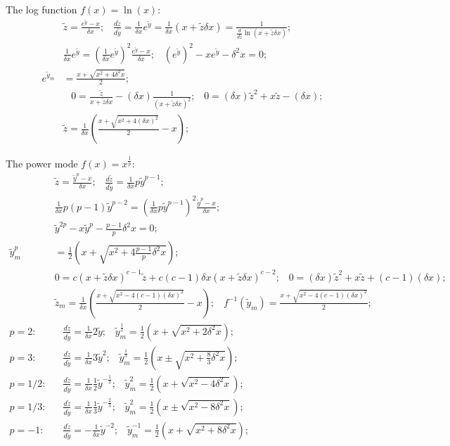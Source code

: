 \documentclass[twoside]{article}
\numberwithin{equation}{section}
\newcommand{\eqspace}{\;\;\;}
\begin{document}
The log function $f(x) = \ln(x)$:
\begin{align*}
& \tilde{z} = \frac{e^{\tilde{y}} - x}{\delta x}; \eqspace 
\frac{d \tilde{z}}{d \tilde{y}} = \frac{1}{\delta x} e^{\tilde{y}} = \frac{1}{\delta x} (x + \tilde{z} \delta x)
 = \frac{1}{\frac{d}{d \tilde{z}} \ln(x + \tilde{z} \delta x)}; \\
& \frac{1}{\delta x} e^{\tilde{y}} = (\frac{1}{\delta x} e^{\tilde{y}})^2 \frac{e^{\tilde{y}} - x}{\delta x}; \eqspace 
(e^{\tilde{y}})^2 - x e^{\tilde{y}} - \delta^2 x = 0; \\
e^{\tilde{y}_m} &= \frac{x + \sqrt{x^2 + 4 \delta^2 x}}{2}; \\
& \eqspace 0 = \frac{\tilde{z}}{x + \tilde{z} \delta x} - (\delta x) \frac{1}{(x + \tilde{z} \delta x)^2}; \eqspace
0 = (\delta x) \tilde{z}^2 + x \tilde{z} - (\delta x); \\
& \tilde{z} = \frac{1}{\delta x}(\frac{x + \sqrt{x^2 + 4 (\delta x)^2}}{2} - x);
\end{align*}

The power mode $f(x) = x^{\frac{1}{p}}$:
\begin{align*}
& \tilde{z} = \frac{\tilde{y}^p - x}{\delta x}; \eqspace 
\frac{d \tilde{z}}{d \tilde{y}} = \frac{1}{\delta x} p \tilde{y}^{p-1}; \\
& \frac{1}{\delta x} p (p - 1) \tilde{y}^{p-2} = (\frac{1}{\delta x} p \tilde{y}^{p-1})^2 \frac{\tilde{y}^p - x}{\delta x}; \\
& \tilde{y}^{2p} - x \tilde{y}^{p} - \frac{p - 1}{p} \delta^2 x = 0; \\
\tilde{y}_m^p &= \frac{1}{2} (x + \sqrt{x^2 + 4 \frac{p - 1}{p} \delta^2 x}); \\
& 0 = c (x + \tilde{z} \delta x)^{c-1} \tilde{z} + c (c-1) \delta x (x + \tilde{z} \delta x)^{c-2}; \eqspace
0 = (\delta x) \tilde{z}^2 + x \tilde{z} + (c - 1) (\delta x); \\
& \tilde{z}_m = \frac{1}{\delta x}(\frac{x + \sqrt{x^2 - 4(c-1)(\delta x)^2}}{2} - x); \eqspace 
f^{-1}(\tilde{y}_m) = \frac{x + \sqrt{x^2 - 4(c-1)(\delta x)^2}}{2}; \\
p = 2:& \eqspace \frac{d \tilde{z}}{d \tilde{y}} = \frac{1}{\delta x} 2 \tilde{y}; \eqspace 
  \tilde{y}_m^{\frac{1}{2}} = \frac{1}{2} \left( x + \sqrt{x^2 + 2 \delta^2 x} \right); \\
p = 3:& \eqspace \frac{d \tilde{z}}{d \tilde{y}} = \frac{1}{\delta x} 3 \tilde{y}^2; \eqspace  
  \tilde{y}_m^{\frac{1}{3}} = \frac{1}{2} \left( x \pm \sqrt{x^2 + \frac{8}{3} \delta^2 x} \right); \\
p = 1/2:& \eqspace \frac{d \tilde{z}}{d \tilde{y}} = \frac{1}{\delta x} \frac{1}{2} \tilde{y}^{-\frac{1}{2}}; \eqspace 
  \tilde{y}_m^2 = \frac{1}{2} \left( x + \sqrt{x^2 - 4 \delta^2 x} \right); \\
p = 1/3:& \eqspace \frac{d \tilde{z}}{d \tilde{y}} = \frac{1}{\delta x} \frac{1}{3} \tilde{y}^{-\frac{2}{3}}; \eqspace
  \tilde{y}_m^2 = \frac{1}{2} \left( x \pm \sqrt{x^2 - 8 \delta^2 x} \right); \\
p = -1:& \eqspace \frac{d \tilde{z}}{d \tilde{y}} = - \frac{1}{\delta x} \tilde{y}^{-2}; \eqspace 
  \tilde{y}_m^{-1} = \frac{1}{2} \left( x + \sqrt{x^2 + 8 \delta^2 x} \right); 
\end{align*}
\end{document}
